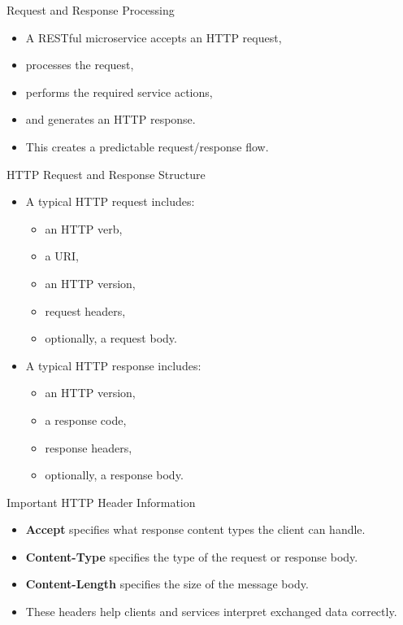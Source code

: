 \begin{frame}{Request and Response Processing}
\begin{itemize}
    \item A RESTful microservice accepts an HTTP request,
    \item processes the request,
    \item performs the required service actions,
    \item and generates an HTTP response.
    \item This creates a predictable request/response flow.
\end{itemize}
\end{frame}

\begin{frame}{HTTP Request and Response Structure}
\begin{itemize}
    \item A typical HTTP request includes:
    \begin{itemize}
        \item an HTTP verb,
        \item a URI,
        \item an HTTP version,
        \item request headers,
        \item optionally, a request body.
    \end{itemize}
    \item A typical HTTP response includes:
    \begin{itemize}
        \item an HTTP version,
        \item a response code,
        \item response headers,
        \item optionally, a response body.
    \end{itemize}
\end{itemize}
\end{frame}

\begin{frame}{Important HTTP Header Information}
\begin{itemize}
    \item \textbf{Accept} specifies what response content types the client can handle.
    \item \textbf{Content-Type} specifies the type of the request or response body.
    \item \textbf{Content-Length} specifies the size of the message body.
    \item These headers help clients and services interpret exchanged data correctly.
\end{itemize}
\end{frame}

